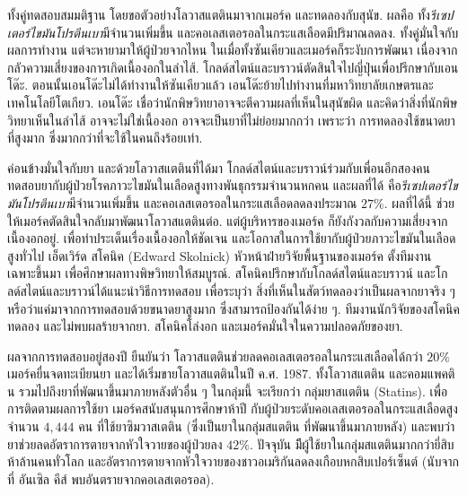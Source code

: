 {\begin{shaded}
ทั้งคู่ทดสอบสมมติฐาน โดยขอตัวอย่างโลวาสแตตินมาจากเมอร์ค และทดลองกับสุนัข.
ผลคือ ทั้ง\textit{รีเซปเตอร์ไขมันโปรตีนเบา}มีจำนวนเพิ่มขึ้น และคอเลสเตอรอลในกระแสเลือดมีปริมาณลดลง.
ทั้งคู่มั่นใจกับผลการทำงาน 
แต่จะหายามาให้ผู้ป่วยจากไหน ในเมื่อทั้งซันเคียวและเมอร์คก็ระงับการพัฒนา เนื่องจากกลัวความเสี่ยงของการเกิดเนื้องอกในลำไส้.
โกลด์สไตน์และบราวน์ตัดสินใจไปญี่ปุ่นเพื่อปรึกษากับเอนโด๊ะ.
ตอนนั้นเอนโด๊ะไม่ได้ทำงานให้ซันเคียวแล้ว เอนโด๊ะย้ายไปทำงานที่มหาวิทยาลัยเกษตรและเทคโนโลยีโตเกียว.
เอนโด๊ะ เชื่อว่านักพิษวิทยาอาจจะตีความผลที่เห็นในสุนัขผิด
และคิดว่าสิ่งที่นักพิษวิทยาเห็นในลำไส้ อาจจะไม่ใช่เนื้องอก อาจจะเป็นยาที่ไม่ย่อยมากกว่า
เพราะว่า การทดลองใช้ขนาดยาที่สูงมาก ซึ่งมากกว่าที่จะใช้ในคนถึงร้อยเท่า.

ค่อนข้างมั่นใจกับยา
และด้วยโลวาสแตตินที่ได้มา
โกลด์สไตน์และบราวน์ร่วมกับเพื่อนอีกสองคน
ทดสอบยากับผู้ป่วยโรคภาวะไขมันในเลือดสูงทางพันธุกรรมจำนวนหกคน
และผลที่ได้ คือ\textit{รีเซปเตอร์ไขมันโปรตีนเบา}มีจำนวนเพิ่มขึ้น
และคอเลสเตอรอลในกระแสเลือดลดลงประมาณ $27\%$.
ผลที่ได้นี้ ช่วยให้เมอร์คตัดสินใจกลับมาพัฒนาโลวาสแตตินต่อ.
แต่ผู้บริหารของเมอร์ค ก็ยังกังวลกับความเสี่ยงจากเนื้องอกอยู่.
เพื่อทำประเด็นเรื่องเนื้องอกให้ชัดเจน และโอกาสในการใช้ยากับผู้ป่วยภาวะไขมันในเลือดสูงทั่วไป
เอ็ดเวิร์ด สโคนิค (Edward Skolnick) หัวหน้าฝ่ายวิจัยพื้นฐานของเมอร์ค
ตั้งทีมงานเฉพาะขึ้นมา เพื่อศึกษาผลทางพิษวิทยาให้สมบูรณ์.
สโคนิคปรึกษากับโกลด์สไตน์และบราวน์
และโกลด์สไตน์และบราวน์ได้แนะนำวิธีการทดสอบ
เพื่อระบุว่า สิ่งที่เห็นในสัตว์ทดลองว่าเป็นผลจากยาจริง ๆ หรือว่าแค่มาจากการทดสอบด้วยขนาดยาสูงมาก ซึ่งสามารถป้องกันได้ง่าย ๆ.
ทีมงานนักวิจัยของสโคนิคทดลอง และไม่พบผลร้ายจากยา.
สโคนิคโล่งอก และเมอร์คมั่นใจในความปลอดภัยของยา.

ผลจากการทดสอบอยู่สองปี
ยืนยันว่า โลวาสแตตินช่วยลดคอเลสเตอรอลในกระแสเลือดได้กว่า $20\%$
เมอร์คยื่นจดทะเบียนยา
และได้เริ่มขายโลวาสแตตินในปี ค.ศ. 1987.
ทั้งโลวาสแตติน และคอมแพคติน รวมไปถึงยาที่พัฒนาขึ้นมาภายหลังตัวอื่น ๆ ในกลุ่มนี้ จะเรียกว่า
กลุ่มยาสแตติน (Statins).
เพื่อการติดตามผลการใช้ยา
เมอร์คสนับสนุนการศึกษาห้าปี กับผู้ป่วยระดับคอเลสเตอรอลในกระแสเลือดสูง
จำนวน $4,444$ คน ที่ใช้ยาซิมวาสเตติน (ซึ่งเป็นยาในกลุ่มสแตติน ที่พัฒนาขึ้นมาภายหลัง)
และพบว่า ยาช่วยลดอัตราการตายจากหัวใจวายของผู้ป่วยลง $42\%$.
ปัจจุบัน มีีผู้ใช้ยาในกลุ่มสแตตินมากกว่ายี่สิบห้าล้านคนทั่วโลก และอัตราการตายจากหัวใจวายของชาวอเมริกันลดลงเกือบหกสิบเปอร์เซ็นต์ 
(นับจากที่ อันเซิล คีส์ พบอันตรายจากคอเลสเตอรอล).


\end{shaded}}

